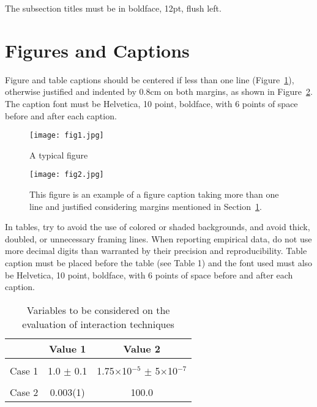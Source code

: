 \documentclass[12pt]{article}
\begin{document}
The subsection titles must be in boldface, 12pt, flush left.

\section{Figures and Captions}\label{sec:figs}


Figure and table captions should be centered if less than one line
(Figure~\ref{fig:exampleFig1}), otherwise justified and indented by 0.8cm on
both margins, as shown in Figure~\ref{fig:exampleFig2}. The caption font must
be Helvetica, 10 point, boldface, with 6 points of space before and after each
caption.

\begin{figure}[ht]
\centering
\texttt{[image: fig1.jpg]}
\caption{A typical figure}
\label{fig:exampleFig1}
\end{figure}

\begin{figure}[ht]
\centering
\texttt{[image: fig2.jpg]}
\caption{This figure is an example of a figure caption taking more than one
  line and justified considering margins mentioned in Section~\ref{sec:figs}.}
\label{fig:exampleFig2}
\end{figure}

In tables, try to avoid the use of colored or shaded backgrounds, and avoid
thick, doubled, or unnecessary framing lines. When reporting empirical data,
do not use more decimal digits than warranted by their precision and
reproducibility. Table caption must be placed before the table (see Table 1)
and the font used must also be Helvetica, 10 point, boldface, with 6 points of
space before and after each caption.

\begin{table}[ht]
\centering
\caption{Variables to be considered on the evaluation of interaction
  techniques}
\label{tab:exTable1}
\smallskip
\begin{tabular}{|l|c|c|}
\hline
& Value 1 & Value 2\\[0.5ex]
\hline
&&\\[-2ex]
Case 1 & 1.0 $\pm$ 0.1 & 1.75$\times$10$^{-5}$ $\pm$ 5$\times$10$^{-7}$\\[0.5ex]
\hline
&&\\[-2ex]
Case 2 & 0.003(1) & 100.0\\[0.5ex]
\hline
\end{tabular}
\end{table}
\end{document}
